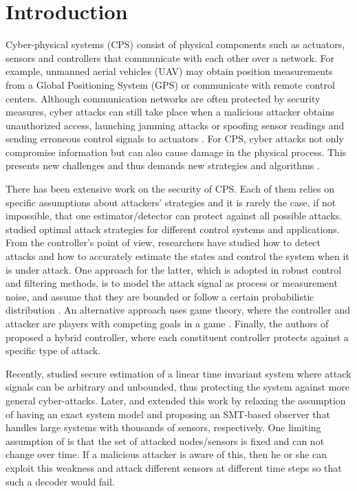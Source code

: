 \documentclass[journal]{IEEEtran}
\begin{document}
\IEEEpeerreviewmaketitle




\section{Introduction}

Cyber-physical systems (CPS) consist of physical components such as actuators, sensors and controllers that communicate with each other over a network. 
For example, unmanned aerial vehicles (UAV) may obtain position measurements from a Global Positioning System (GPS) or communicate with remote control centers.
Although communication networks are often protected by security measures, cyber attacks can still take place when a malicious attacker obtains unauthorized access, launching jamming attacks \cite{Gligor} or spoofing sensor readings and sending erroneous control signals to actuators \cite{Mo}. For CPS, cyber attacks not only compromise information but can also cause damage in the physical process. This presents new challenges and thus demands new strategies and algorithms \cite{Sastry}. 

There has been extensive work on the security of CPS. 
Each of them relies on specific assumptions about attackers' strategies and it is rarely the case, if not impossible, that one estimator/detector can protect against all possible attacks. 
\cite{Tong, KwonACC, Reiter, Sastry2} studied optimal attack strategies for different control systems and applications. 
From the controller's point of view, researchers have studied how to detect attacks \cite{Blanke, Willsky} and how to accurately estimate the states and control the system when it is under attack. One approach for the latter, which is adopted in robust control and filtering methods, is to model the attack signal as process or measurement noise, and assume that they are bounded \cite{Zhou_Doyle} or follow a certain probabilistic distribution \cite{Bullo, Liu}.
An alternative approach uses game theory, where the controller and attacker are players with competing goals in a game \cite{Wu, Basar, Basar2, Walrand, Pappas}. Finally, the authors of \cite{KwonCDC} proposed a hybrid controller, where each constituent controller protects against a specific type of attack.


Recently, \cite{Fawzi2014} studied secure estimation of a linear time invariant system where attack signals can be arbitrary and unbounded, thus protecting the system against more general cyber-attacks. Later, \cite{Pajic2014} and \cite{shoukry2016smt} extended this work by relaxing the assumption of having an exact system model and proposing an SMT-based observer that handles large systems with thousands of sensors, respectively. 
One limiting assumption of \cite{Fawzi2014,Pajic2014,shoukry2016smt} is that the set of attacked nodes/sensors is fixed and can not change over time. 
If a malicious attacker is aware of this, then he or she can exploit this weakness and attack different sensors at different time steps so that such a decoder would fail.
\end{document}
